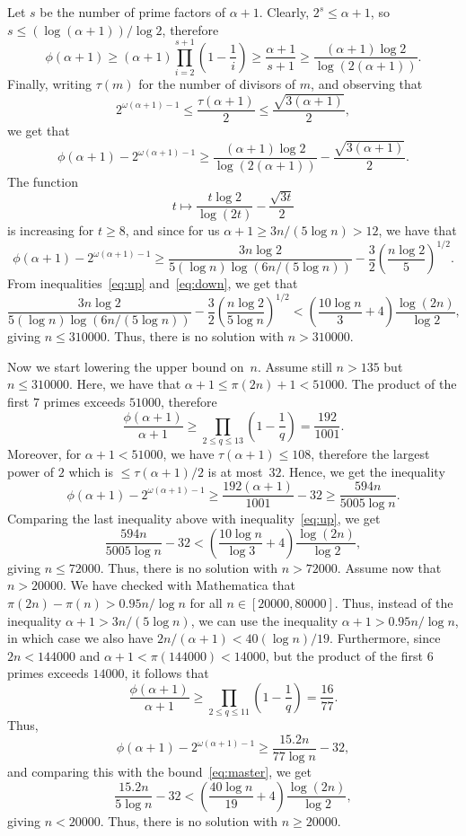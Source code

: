 \documentclass[twoside,amsthm]{elsart}
\begin{document}
Let $s$ be the number of prime factors of $\alpha+1$. Clearly,
$2^s\le \alpha+1$, so $s\le (\log(\alpha+1))/\log 2$, therefore
$$
\phi(\alpha+1) \ge
(\alpha+1) \prod_{i=2}^{s+1}\left(1-\frac{1}{i}\right) \ge
\frac{\alpha+1}{s+1}\ge \frac{(\alpha+1)\log 2}{\log(2(\alpha+1))}.
$$
Finally, writing $\tau(m)$ for the number of divisors of $m$, and
observing that
$$
2^{\omega(\alpha+1)-1}\le \frac{\tau(\alpha+1)}{2} \le
\frac{\sqrt{3(\alpha+1)}}{2},
$$
we get that
$$
\phi(\alpha+1)-2^{\omega(\alpha+1)-1}
\ge \frac{(\alpha+1)\log 2}{\log(2(\alpha+1))}
- \frac{\sqrt{3(\alpha+1)}}{2}.
$$
The function
$$
t\mapsto \frac{t\log 2}{\log(2t)} - \frac{\sqrt{3t}}{2}
$$
is increasing for $t\ge 8$, and since for us 
$\alpha+1\ge 3n/(5\log n)>12$, we have that
\begin{equation}
\label{eq:down} 
\phi(\alpha+1)-2^{\omega(\alpha+1)-1} \ge
\frac{3n\log 2}{5(\log n)\log(6n/(5\log n))}
- \frac{3}{2}\left(\frac{n\log 2}{5}\right)^{1/2}.
\end{equation}
From inequalities~\eqref{eq:up} and~\eqref{eq:down}, we get that
$$
\frac{3n\log 2}{5(\log n)\log(6n/(5\log n))}
- \frac{3}{2}\left(\frac{n\log 2}{5\log n}\right)^{1/2}
< \left(\frac{10\log n}{3}+4\right) \frac{\log(2n)}{\log 2},
$$
giving $n\le 310000$. Thus, there is no solution with $n>310000$.

Now we start lowering the upper bound on~$n$. Assume  still $n>135$
but $n\le 310000$. Here, we have that $\alpha+1\le \pi(2n)+1<51000$.
The product of the first $7$ primes exceeds $51000$, therefore
$$
\frac{\phi(\alpha+1)}{\alpha+1}\ge \prod_{2\le q\le 13}
\left(1-\frac{1}{q}\right)=\frac{192}{1001}.
$$
Moreover, for $\alpha+1<51000$, we have $\tau(\alpha+1)\le 108$,
therefore the largest power of $2$ which is $\le \tau(\alpha+1)/2$
is at most~$32$. Hence, we get the inequality
$$
\phi(\alpha+1)-2^{\omega(\alpha+1)-1} \ge
\frac{192(\alpha+1)}{1001}-32\ge \frac{594n}{5005\log n}.
$$
Comparing the last inequality above with inequality~\eqref{eq:up},
we get
$$
\frac{594 n}{5005 \log n}-32 
< \left(\frac{10\log n}{\log 3}+4\right)
\frac{\log(2n)}{\log 2},
$$
giving $n\le 72000$. Thus, there is no solution with $n>72000$.
Assume now that $n>20000$. We have checked with Mathematica that
$\pi(2n)-\pi(n)>0.95 n/\log n$ for all $n\in [20000,80000]$. Thus,
instead of the inequality $\alpha+1>3 n/(5\log n)$, we can use the
inequality $\alpha+1>0.95 n/\log n$, in which case we also have
$2n/(\alpha+1)<40(\log n)/19$. Furthermore, since $2n<144000$ and
$\alpha+1<\pi(144000)<14000$, but the product of the first $6$
primes exceeds $14000$, it follows that
$$
\frac{\phi(\alpha+1)}{\alpha+1}\ge \prod_{2\le q\le 11}
\left(1-\frac{1}{q}\right)=\frac{16}{77}.
$$
Thus,
$$
\phi(\alpha+1)-2^{\omega(\alpha+1)-1}
\ge \frac{15.2 n}{77\log n}-32,
$$
and comparing this with the bound~\eqref{eq:master}, we get
$$
\frac{15.2 n}{5\log n}-32 < \left(\frac{40\log n}{19}
+ 4\right) \frac{\log(2n)}{\log 2},
$$
giving $n<20000$. Thus, there is no solution with $n\ge 20000$.
\end{document}
